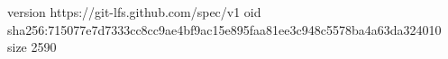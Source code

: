 version https://git-lfs.github.com/spec/v1
oid sha256:715077e7d7333cc8cc9ae4bf9ac15e895faa81ee3c948c5578ba4a63da324010
size 2590
